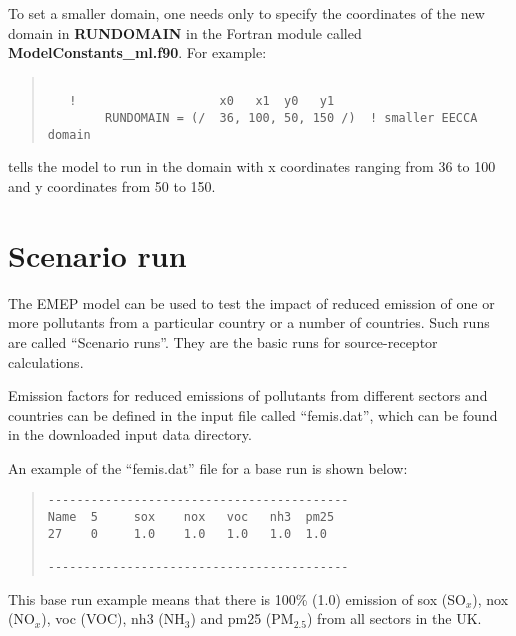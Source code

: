 To set a smaller domain, one needs only to specify the
coordinates of the new domain in {\bf RUNDOMAIN} in the Fortran module
called {\bf ModelConstants\_ml.f90}. For example:

\begin{quote}

\begin{verbatim}
  
   !                    x0   x1  y0   y1
        RUNDOMAIN = (/  36, 100, 50, 150 /)  ! smaller EECCA domain

\end{verbatim}
\end{quote}

tells the model to run in the domain with x coordinates ranging from
36 to 100 and y coordinates from 50 to 150.\\ 

\section{Scenario run}
\label{sec:scenrun}

The EMEP  model can be used to test the impact of reduced emission of
one or more pollutants from a particular country or a number of
countries.  Such runs are called ``Scenario runs''. They are the basic
runs for source-receptor calculations.


Emission factors for reduced emissions of pollutants from different
sectors and countries can be defined in the input file called
``femis.dat'', which can be found in the downloaded input data
directory.

An example of the ``femis.dat'' file for a base run is shown below:
\begin{quote}

\begin{verbatim}
------------------------------------------
Name  5     sox    nox   voc   nh3  pm25
27    0     1.0    1.0   1.0   1.0  1.0  

------------------------------------------
\end{verbatim}
\end{quote}
\noindent
This base run example means that there is 100\% (1.0) emission of sox (SO$_x$),
nox (NO$_x$), voc (VOC), nh3 (NH$_3$) and pm25 (PM$_{2.5}$) from all
sectors in the UK. 

